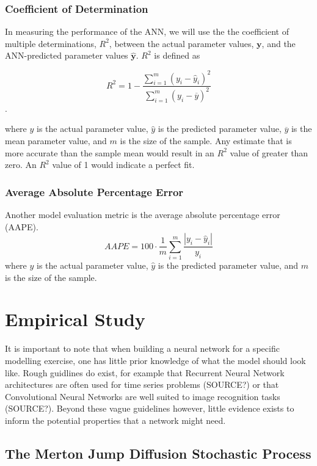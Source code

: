 \documentclass[11pt,oneside,openany,a4paper,english, report, goldenblock
]{usthesis}
\begin{document}
\subsection{Coefficient of Determination}
In measuring the performance of the ANN, we will use the the coefficient of multiple determinations, $ R^2 $, between the actual parameter values, $ \mathbf{y} $, and the ANN-predicted parameter values $ \mathbf{\hat{y}}$. $ R^2 $ is defined as

\begin{equation}
R^2 = 1 - \frac{\sum_{i=1}^{m}\left(y_i-\hat{y}_i\right)^2}{\sum_{i=1}^{m}\left(y_i-\overline{y}\right)^2}
\end{equation}.

where $y$ is the actual parameter value, $\hat{y}$ is the predicted parameter value, $\overline{y}$ is the mean parameter value, and $m$ is the size of the sample. Any estimate that is more accurate than the sample mean would result in an $ R^2 $ value of greater than zero. An $ R^2 $ value of 1 would indicate a perfect fit.

\subsection{Average Absolute Percentage Error}
Another model evaluation metric is the average absolute percentage error (AAPE).
\begin{equation}
AAPE = 100 \cdot \frac{1}{m} \sum_{i=1}^{m} \frac{\left| y_i - \hat{y}_i \right|}{y_i}
\end{equation}
where $y$ is the actual parameter value, $\hat{y}$ is the predicted parameter value, and $m$ is the size of the sample.

\chapter{Empirical Study}

It is important to note that when building a neural network for a specific modelling exercise, one has little prior knowledge of what the model should look like. Rough guidlines do exist, for example that Recurrent Neural Network architectures are often used for time series problems (SOURCE?) or that Convolutional Neural Networks are well suited to image recognition tasks (SOURCE?). Beyond these vague guidelines however, little evidence exists to inform the potential properties that a network might need.

\section{The Merton Jump Diffusion Stochastic Process}
\end{document}
